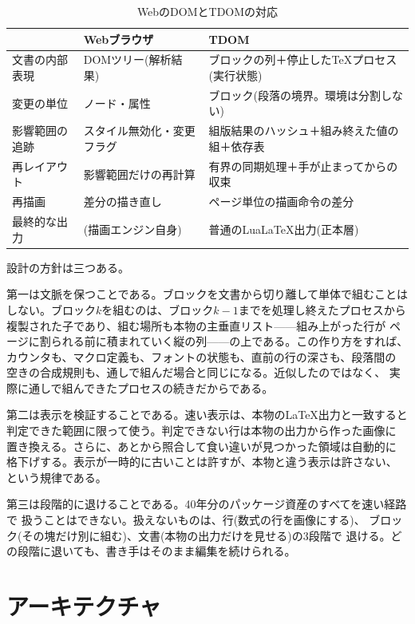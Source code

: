 \documentclass[a4paper,11pt]{ltjsarticle}
\newcommand{\tdom}{TDOM}
\begin{document}
\begin{table}[!ht]
  \centering\small
  \caption{WebのDOMと\tdom{}の対応}
  \label{tab:dom}
  \begin{tabular}{@{}lll@{}}
    \toprule
    & Webブラウザ & \tdom{}\\
    \midrule
    文書の内部表現 & DOMツリー(解析結果) & ブロックの列＋停止したTeXプロセス(実行状態)\\
    変更の単位 & ノード・属性 & ブロック(段落の境界。環境は分割しない)\\
    影響範囲の追跡 & スタイル無効化・変更フラグ & 組版結果のハッシュ＋組み終えた値の組＋依存表\\
    再レイアウト & 影響範囲だけの再計算 & 有界の同期処理＋手が止まってからの収束\\
    再描画 & 差分の描き直し & ページ単位の描画命令の差分\\
    最終的な出力 & (描画エンジン自身) & 普通のLuaLaTeX出力(正本層)\\
    \bottomrule
  \end{tabular}
\end{table}

設計の方針は三つある。

第一は文脈を保つことである。ブロックを文書から切り離して単体で組むことは
しない。ブロック$k$を組むのは、ブロック$k{-}1$までを処理し終えたプロセスから
複製された子であり、組む場所も本物の主垂直リスト——組み上がった行が
ページに割られる前に積まれていく縦の列——の上である。この作り方をすれば、
カウンタも、マクロ定義も、フォントの状態も、直前の行の深さも、段落間の
空きの合成規則も、通しで組んだ場合と同じになる。近似したのではなく、
実際に通しで組んできたプロセスの続きだからである。

第二は表示を検証することである。速い表示は、本物の\LaTeX{}出力と一致すると
判定できた範囲に限って使う。判定できない行は本物の出力から作った画像に
置き換える。さらに、あとから照合して食い違いが見つかった領域は自動的に
格下げする。表示が一時的に古いことは許すが、本物と違う表示は許さない、
という規律である。

第三は段階的に退けることである。40年分のパッケージ資産のすべてを速い経路で
扱うことはできない。扱えないものは、行(数式の行を画像にする)、
ブロック(その塊だけ別に組む)、文書(本物の出力だけを見せる)の3段階で
退ける。どの段階に退いても、書き手はそのまま編集を続けられる。

\section{アーキテクチャ}\label{sec:arch}
\end{document}
